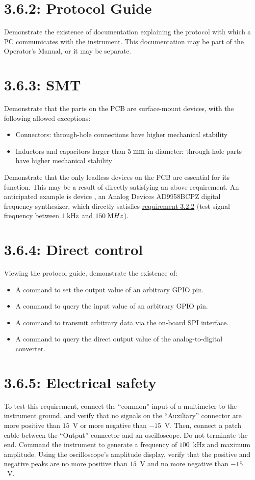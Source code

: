 \section*{3.6.2: Protocol Guide}
Demonstrate the existence of documentation explaining the protocol with which a PC communicates with the
instrument. This documentation may be part of the Operator's Manual, or it may be separate.

\section*{3.6.3: SMT}
Demonstrate that the parts on the PCB are surface-mount devices, with the following allowed
exceptions:
\begin{itemize}
\item{Connectors: through-hole connections have higher mechanical stability}
\item{Inductors and capacitors larger than $5\;\mathrm{mm}$ in diameter: through-hole parts have higher mechanical stability}
\end{itemize}

Demonstrate that the only leadless devices on the PCB are essential for its function. This may be
a result of directly satisfying an above requirement. An anticipated example is device ,
an Analog Devices AD9958BCPZ digital frequency synthesizer, which directly satisfies
\hyperref[tp:3.2.2]{requirement 3.2.2} (test signal frequency between $1\;\mathrm{kHz}$ and $150\;\mathrm{M}Hz$).

\section*{3.6.4: Direct control}
Viewing the protocol guide, demonstrate the existence of:

\begin{itemize}
\item{A command to set the output value of an arbitrary GPIO pin.}
\item{A command to query the input value of an arbitrary GPIO pin.}
\item{A command to transmit arbitrary data via the on-board SPI interface.}
\item{A command to query the direct output value of the analog-to-digital converter.}
\end{itemize}

\section*{3.6.5: Electrical safety}
To test this requirement, connect the ``common'' input of a multimeter to the instrument ground, and
verify that no signals on the ``Auxiliary'' connector are more positive than $15$~V or more negative than $-15$~V.
Then, connect a patch cable between the ``Output'' connector and an oscilloscope. Do not terminate the end. Command
the instrument to generate a frequency of $100$~kHz and maximum amplitude. Using the oscilloscope's amplitude display,
verify that the positive and negative peaks are no more positive than $15$~V and no more negative than
$-15$~V.
